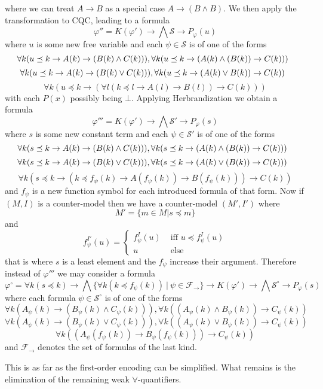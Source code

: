 \documentclass[a4paper,UKenglish,cleveref, autoref, thm-restate]{lipics-v2021}
\begin{document}
where we can treat $A\to B$ as a special case $A\to (B\wedge B)$. We then apply the transformation to CQC, leading to a formula
$$\varphi'' = K(\varphi')\to\bigwedge  \mathcal S\to P_\varphi(u)$$
where $u$ is some new free variable and each $\psi\in\mathcal S$ is of one of the forms
$$\hspace*{-2mm}\forall k(u\preceq k\to A(k)\to (B(k)\wedge C(k))), \forall k(u\preceq k\to (A(k)\wedge (B(k))\to C(k)))$$
$$\hspace*{-2mm}\forall k(u\preceq k\to A(k)\to (B(k)\vee C(k))), \forall k(u\preceq k\to (A(k)\vee B(k))\to C(k))$$
$$\forall k(u\preceq k\to (\forall l(k\preceq l \to A(l)\to B(l))\to C(k)))$$
with each $P(x)$ possibly being $\bot$. Applying Herbrandization we obtain a formula
$$\varphi''' = K(\varphi')\to \bigwedge \mathcal S'\to P_\varphi(s)$$
where $s$ is some new constant term and each $\psi\in\mathcal S'$ is of one of the forms
$$\hspace*{-2mm}\forall k(s\preceq k\to A(k)\to (B(k)\wedge C(k))), \forall k(s\preceq k\to (A(k)\wedge (B(k))\to C(k)))$$
$$\hspace*{-2mm}\forall k(s\preceq k\to A(k)\to (B(k)\vee C(k))), \forall k(s\preceq k\to (A(k)\vee (B(k))\to C(k)))$$
$$\forall k(s\preceq k\to (k\preceq f_\psi(k) \to A(f_\psi(k))\to B(f_\psi(k)))\to C(k))$$
and $f_\psi$ is a new function symbol for each introduced formula of that form. Now if $(M, I)$ is a counter-model then we have a counter-model $(M',I')$ where $$M' = \{m\in M|s\preceq m\}$$ and
$$f_\psi^{I'}(u) = \begin{cases}
	f^I_\psi(u)&\text{ iff $u\preceq f^{I}_\psi(u)$}\\
	u&\text{ else}
\end{cases}$$ that is where $s$ is a least element and the $f_\psi$ increase their argument. Therefore instead of $\varphi'''$ we may consider a formula $$\varphi^\circ = \forall k(s\preceq k)\to \bigwedge\{\forall k(k\preceq f_\psi(k))\:|\:\psi\in\mathcal F_\to\}\to K(\varphi')\to \bigwedge \mathcal S^\circ\to P_\varphi(s)$$ where each formula $\psi\in\mathcal S^\circ$ is of one of the forms
$$\forall k(A_\psi(k)\to (B_\psi(k)\wedge C_\psi(k))), \forall k((A_\psi(k)\wedge B_\psi(k))\to C_\psi(k))$$
$$\forall k(A_\psi(k)\to (B_\psi(k)\vee C_\psi(k))), \forall k((A_\psi(k)\vee B_\psi(k))\to C_\psi(k))$$
$$\forall k((A_\psi(f_\psi(k))\to B_\psi(f_\psi(k)))\to C_\psi(k))$$
and $\mathcal F_\to$ denotes the set of formulas of the last kind.

This is as far as the first-order encoding can be simplified. What remains is the elimination of the remaining weak $\forall$-quantifiers.
\end{document}
